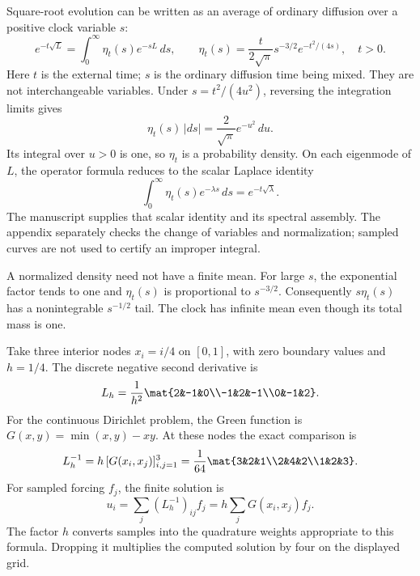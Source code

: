 Square-root evolution can be written as an average of ordinary diffusion over a positive clock variable $s$:
\[
e^{-t\sqrt L}=\int_0^\infty \eta_t(s)e^{-sL}\,ds,
\qquad
\eta_t(s)=\frac{t}{2\sqrt\pi}s^{-3/2}e^{-t^2/(4s)},\quad t>0.
\]
Here $t$ is the external time; $s$ is the ordinary diffusion time being mixed. They are not interchangeable variables.
Under $s=t^2/(4u^2)$, reversing the integration limits gives
\[
\eta_t(s)\,|ds|=\frac2{\sqrt\pi}e^{-u^2}\,du.
\]
Its integral over $u>0$ is one, so $\eta_t$ is a probability density. On each eigenmode of $L$, the operator formula reduces to the scalar Laplace identity
\[
\int_0^\infty\eta_t(s)e^{-\lambda s}\,ds=e^{-t\sqrt\lambda}.
\]
The manuscript supplies that scalar identity and its spectral assembly. The appendix separately checks the change of variables and normalization; sampled curves are not used to certify an improper integral.

A normalized density need not have a finite mean. For large $s$, the exponential factor tends to one and $\eta_t(s)$ is proportional to $s^{-3/2}$. Consequently $s\eta_t(s)$ has a nonintegrable $s^{-1/2}$ tail. The clock has infinite mean even though its total mass is one.

Take three interior nodes $x_i=i/4$ on $[0,1]$, with zero boundary values and $h=1/4$. The discrete negative second derivative is
\[
L_h=\frac1{h^2}\mat{2&-1&0\\-1&2&-1\\0&-1&2}.
\]
For the continuous Dirichlet problem, the Green function is $G(x,y)=\min(x,y)-xy$. At these nodes the exact comparison is
\[
L_h^{-1}=h\,[G(x_i,x_j)]_{i,j=1}^3
=\frac1{64}\mat{3&2&1\\2&4&2\\1&2&3}.
\]
For sampled forcing $f_j$, the finite solution is
\[
u_i=\sum_j(L_h^{-1})_{ij}f_j
=h\sum_jG(x_i,x_j)f_j.
\]
The factor $h$ converts samples into the quadrature weights appropriate to this formula. Dropping it multiplies the computed solution by four on the displayed grid.

